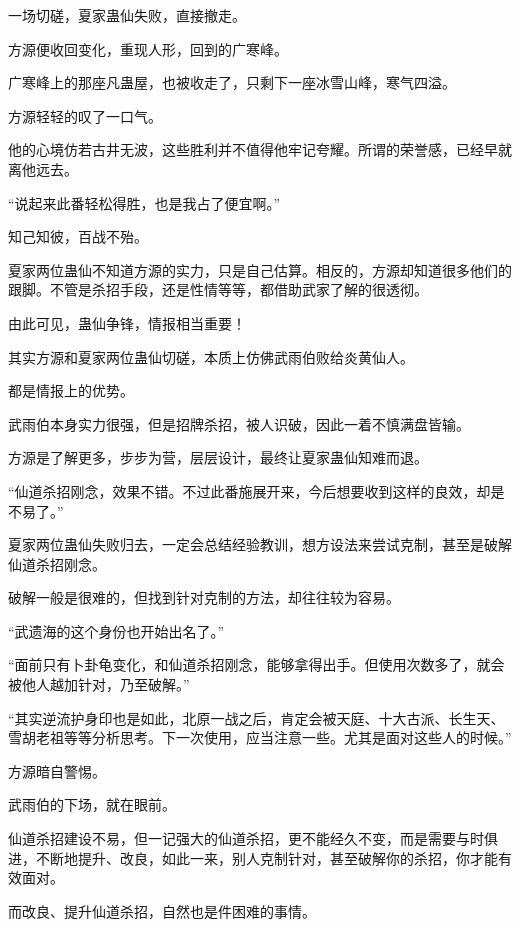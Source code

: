 
\begin{this_body}

一场切磋，夏家蛊仙失败，直接撤走。

方源便收回变化，重现人形，回到的广寒峰。

广寒峰上的那座凡蛊屋，也被收走了，只剩下一座冰雪山峰，寒气四溢。

方源轻轻的叹了一口气。

他的心境仿若古井无波，这些胜利并不值得他牢记夸耀。所谓的荣誉感，已经早就离他远去。

“说起来此番轻松得胜，也是我占了便宜啊。”

知己知彼，百战不殆。

夏家两位蛊仙不知道方源的实力，只是自己估算。相反的，方源却知道很多他们的跟脚。不管是杀招手段，还是性情等等，都借助武家了解的很透彻。

由此可见，蛊仙争锋，情报相当重要！

其实方源和夏家两位蛊仙切磋，本质上仿佛武雨伯败给炎黄仙人。

都是情报上的优势。

武雨伯本身实力很强，但是招牌杀招，被人识破，因此一着不慎满盘皆输。

方源是了解更多，步步为营，层层设计，最终让夏家蛊仙知难而退。

“仙道杀招刚念，效果不错。不过此番施展开来，今后想要收到这样的良效，却是不易了。”

夏家两位蛊仙失败归去，一定会总结经验教训，想方设法来尝试克制，甚至是破解仙道杀招刚念。

破解一般是很难的，但找到针对克制的方法，却往往较为容易。

“武遗海的这个身份也开始出名了。”

“面前只有卜卦龟变化，和仙道杀招刚念，能够拿得出手。但使用次数多了，就会被他人越加针对，乃至破解。”

“其实逆流护身印也是如此，北原一战之后，肯定会被天庭、十大古派、长生天、雪胡老祖等等分析思考。下一次使用，应当注意一些。尤其是面对这些人的时候。”

方源暗自警惕。

武雨伯的下场，就在眼前。

仙道杀招建设不易，但一记强大的仙道杀招，更不能经久不变，而是需要与时俱进，不断地提升、改良，如此一来，别人克制针对，甚至破解你的杀招，你才能有效面对。

而改良、提升仙道杀招，自然也是件困难的事情。


\end{this_body}
